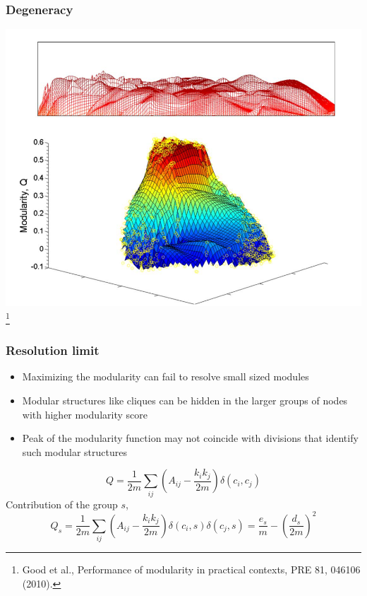 \documentclass{beamer}
\begin{document}
\begin{frame}
    \frametitle{Degeneracy}
    \centering
    \includegraphics[width = 0.8\columnwidth]{modularity_degeneracy.png}
    \footnote{Good et al., Performance of modularity in practical contexts, PRE 81, 046106 (2010).}
\end{frame}
\begin{frame}
    \frametitle{Resolution limit}
    \begin{itemize}
    \setlength\itemsep{1em}
        \item{Maximizing the modularity can fail to resolve small sized modules}
        \item{Modular structures like cliques can be hidden in the larger groups of nodes with higher modularity score}
        \item{Peak of the modularity function may not coincide with divisions that identify such modular structures}
    \end{itemize}

    $$Q = \frac{1}{2m}\sum\limits_{ij}\left(A_{ij}-\frac{k_ik_j}{2m}\right)\delta(c_i,c_j)$$
    Contribution of the group $s$,
    $$Q_s = \frac{1}{2m}\sum\limits_{ij}\left(A_{ij}-\frac{k_ik_j}{2m}\right)\delta(c_i, s)\delta(c_j, s) = \frac{e_s}{m}-\left(\frac{d_s}{2m}\right)^2$$

\end{frame}
\end{document}
